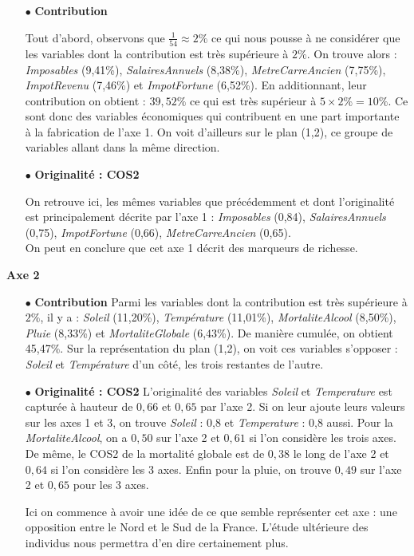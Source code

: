 \documentclass{article}
\begin{document}
\begin{itemize}
	\item[$\bullet$] \textbf{Contribution}

	Tout d'abord, observons que $ \frac{1}{54}\approx 2\%$ ce qui nous 	pousse à ne considérer que les variables dont la contribution est très supérieure à $2\%$. On trouve alors : \emph{Imposables} (9,41\%), \emph{SalairesAnnuels} (8,38\%), \emph{MetreCarreAncien} (7,75\%), \emph{ImpotRevenu} (7,46\%) et \emph{ImpotFortune} (6,52\%). En additionnant, leur contribution on obtient : $39,52\%$ ce qui est très supérieur à $5\times 2\%=10\%$. Ce sont donc des variables économiques qui contribuent en une part importante à la fabrication de l'axe 1. On voit d'ailleurs sur le plan (1,2), ce groupe de variables allant dans la même direction.

	\item[$\bullet$] \textbf{Originalité : COS2}
	
	On retrouve ici, les mêmes variables que précédemment et dont l'originalité est principalement décrite par l'axe 1 : \emph{Imposables} (0,84), \emph{SalairesAnnuels} (0,75), \emph{ImpotFortune} (0,66), \emph{MetreCarreAncien} (0,65). \\
	
On peut en conclure que cet axe 1 décrit des marqueurs de richesse.
	
\end{itemize}

\bigskip

{\large \textbf{Axe 2}}

\begin{itemize}
\item[$\bullet$] \textbf{Contribution}
Parmi les variables dont la contribution est très supérieure à $2\%$, il y a : \emph{Soleil} (11,20\%), \emph{Température} (11,01\%), \emph{MortaliteAlcool} (8,50\%), \emph{Pluie} (8,33\%) et \emph{MortaliteGlobale} (6,43\%). De manière cumulée, on obtient 45,47\%. Sur la représentation du plan (1,2), on voit ces variables s'opposer : \emph{Soleil} et \emph{Température} d'un côté, les trois restantes de l'autre.  

\item[$\bullet$] \textbf{Originalité : COS2}
L'originalité des variables \emph{Soleil} et \emph{Temperature} est capturée à hauteur de $0,66$ et $0,65$ par l'axe 2. Si on leur ajoute leurs valeurs sur les axes 1 et 3, on trouve \emph{Soleil} : 0,8 et \emph{Temperature} : 0,8 aussi. Pour la \emph{MortaliteAlcool}, on a $0,50$ sur l'axe 2 et $0,61$ si l'on considère les trois axes. De même, le COS2 de la mortalité globale est de $0,38$ le long de l'axe 2 et $0,64$ si l'on considère les 3 axes. Enfin pour la pluie, on trouve $0,49$ sur l'axe 2 et $0,65$ pour les 3 axes.

Ici on commence à avoir une idée de ce que semble représenter cet axe : une opposition entre le Nord et le Sud de la  France. L'étude ultérieure des individus nous permettra d'en dire  certainement plus.

\end{itemize} 
\end{document}
